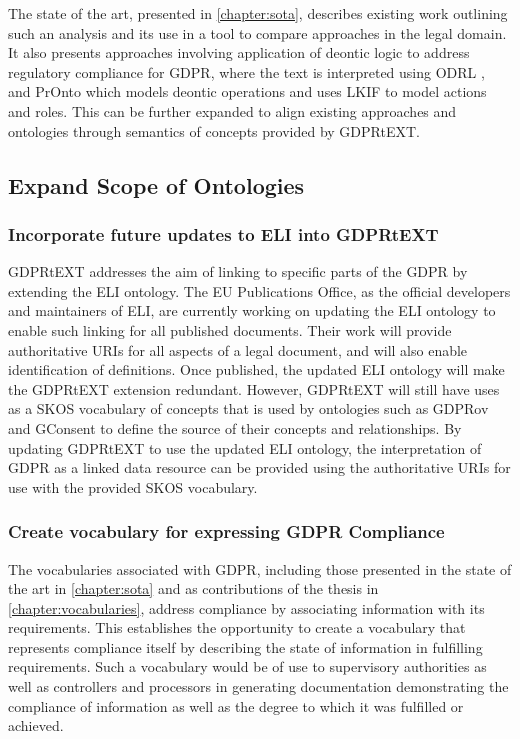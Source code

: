 The state of the art, presented in \autoref{chapter:sota}, describes existing work outlining such an analysis \cite{leone_taking_2019} and its use in a tool \cite{leone_legal_2018} to compare approaches in the legal domain. It also presents approaches involving application of deontic logic to address regulatory compliance for GDPR, where the text is interpreted using ODRL \cite{agarwal_legislative_2018}, and  PrOnto \cite{palmirani_pronto_2018} which models deontic operations and uses LKIF \cite{hoekstra_lkif_2007} to model actions and roles.
This can be further expanded to align existing approaches and ontologies through semantics of concepts provided by GDPRtEXT.

\subsection*{Expand Scope of Ontologies}
\subsubsection*{Incorporate future updates to ELI into GDPRtEXT}
GDPRtEXT addresses the aim of linking to specific parts of the GDPR by extending the ELI ontology. The EU Publications Office, as the official developers and maintainers of ELI, are currently working on updating the ELI ontology to enable such linking for all published documents. Their work will provide authoritative URIs for all aspects of a legal document, and will also enable identification of definitions. Once published, the updated ELI ontology will make the GDPRtEXT extension redundant. However, GDPRtEXT will still have uses as a SKOS vocabulary of concepts that is used by ontologies such as GDPRov and GConsent to define the source of their concepts and relationships. By updating GDPRtEXT to use the updated ELI ontology, the interpretation of GDPR as a linked data resource can be provided using the authoritative URIs for use with the provided SKOS vocabulary.

\subsubsection*{Create vocabulary for expressing GDPR Compliance}
The vocabularies associated with GDPR, including those presented in the state of the art in \autoref{chapter:sota} and as contributions of the thesis in \autoref{chapter:vocabularies}, address compliance by associating information with its requirements. This establishes the opportunity to create a vocabulary that represents compliance itself by describing the state of information in fulfilling requirements. Such a vocabulary would be of use to supervisory authorities as well as controllers and processors in generating documentation demonstrating the compliance of information as well as the degree to which it was fulfilled or achieved.

